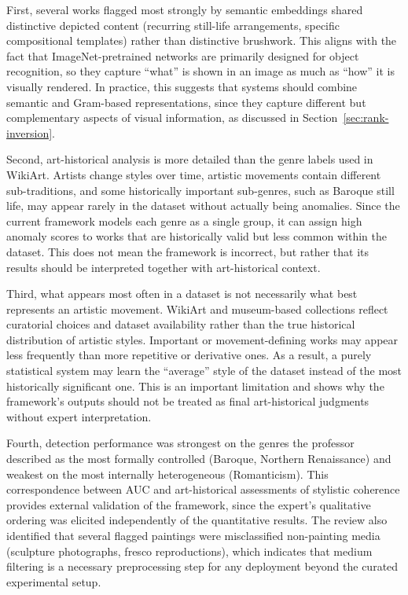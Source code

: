 \documentclass[conference]{IEEEtran}
\begin{document}
First, several works flagged most strongly by semantic embeddings shared distinctive depicted content (recurring still-life arrangements, specific compositional templates) rather than distinctive brushwork. This aligns with the fact that ImageNet-pretrained networks are primarily designed for object recognition, so they capture “what” is shown in an image as much as “how” it is visually rendered. In practice, this suggests that systems should combine semantic and Gram-based representations, since they capture different but complementary aspects of visual information, as discussed in Section~\ref{sec:rank-inversion}.

Second, art-historical analysis is more detailed than the genre labels used in WikiArt. Artists change styles over time, artistic movements contain different sub-traditions, and some historically important sub-genres, such as Baroque still life, may appear rarely in the dataset without actually being anomalies. Since the current framework models each genre as a single group, it can assign high anomaly scores to works that are historically valid but less common within the dataset. This does not mean the framework is incorrect, but rather that its results should be interpreted together with art-historical context.

Third, what appears most often in a dataset is not necessarily what best represents an artistic movement. WikiArt and museum-based collections reflect curatorial choices and dataset availability rather than the true historical distribution of artistic styles. Important or movement-defining works may appear less frequently than more repetitive or derivative ones. As a result, a purely statistical system may learn the “average” style of the dataset instead of the most historically significant one. This is an important limitation and shows why the framework’s outputs should not be treated as final art-historical judgments without expert interpretation.

Fourth, detection performance was strongest on the genres the professor described as the most formally controlled (Baroque, Northern Renaissance) and weakest on the most internally heterogeneous (Romanticism). This correspondence between AUC and art-historical assessments of stylistic coherence provides external validation of the framework, since the expert's qualitative ordering was elicited independently of the quantitative results. The review also identified that several flagged paintings were misclassified non-painting media (sculpture photographs, fresco reproductions), which indicates that medium filtering is a necessary preprocessing step for any deployment beyond the curated experimental setup.
\end{document}
